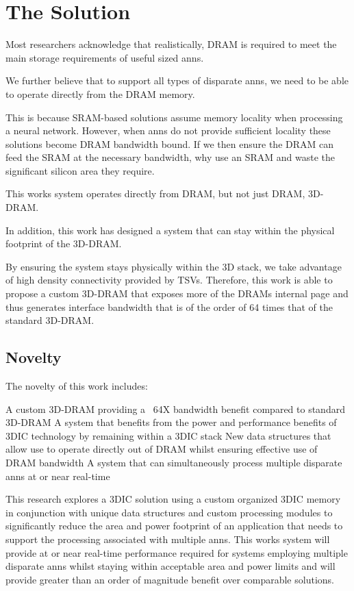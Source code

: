 \section[The Solution]{The Solution}
\label{sec:The Solution}

Most researchers acknowledge that realistically, DRAM is required to meet the main storage requirements of useful sized \ac{ann}s.

We further believe that to support all types of disparate \ac{ann}s, we need to be able to operate directly from the DRAM memory.

This is because SRAM-based solutions assume memory locality when processing a neural network. However, when \ac{ann}s do not provide sufficient locality these solutions become DRAM bandwidth bound. If we then ensure the DRAM can feed the SRAM at the necessary bandwidth, why use an SRAM and waste the significant silicon area they require.

This works system operates directly from DRAM, but not just DRAM, 3D-DRAM.

In addition, this work has designed a system that can stay within the physical footprint of the 3D-DRAM.

By ensuring the system stays physically within the 3D stack, we take advantage of high density connectivity provided by TSVs. 
Therefore, this work is able to propose a custom 3D-DRAM that exposes more of the DRAMs internal page and thus generates interface bandwidth that is of the order of 64 times that of the standard 3D-DRAM.

\subsection[Novelty]{Novelty}
\label{sec:Novelty}

The novelty of this work includes:
\begin{outline}
    \1 A custom 3D-DRAM providing a ~64X bandwidth benefit compared to standard 3D-DRAM
    \1 A system that benefits from the power and performance benefits of 3DIC technology by remaining within a 3DIC stack
    \1 New data structures that allow use to operate directly out of DRAM whilst ensuring effective use of DRAM bandwidth
    \1 A system that can simultaneously process multiple disparate \ac{ann}s at or near real-time
\end{outline}


This research explores a 3DIC solution using a custom organized 3DIC memory in conjunction with unique data structures and custom processing modules to significantly reduce the 
area and power footprint of an application that needs to support the processing associated with multiple \ac{ann}s.
This works system will provide at or near real-time performance required for systems employing multiple disparate \ac{ann}s whilst staying within acceptable area and power limits and will provide greater than an order of magnitude benefit over comparable solutions.



